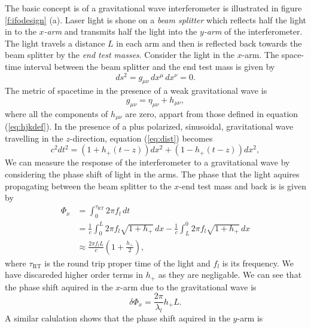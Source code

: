 The basic concept is of a gravitational wave interferometer is illustrated in
figure \ref{f:ifodesign} (a). Laser light is shone on a \emph{beam splitter}
which reflects half the light in to the \emph{$x$-arm} and transmits half the
light into the \emph{$y$-arm} of the interferometer. The light travels a
distance $L$ in each arm and then is reflected back towards the beam splitter
by the \emph{end test masses}. Consider the light in the $x$-arm. The
space-time interval between the beam splitter and the end test mass is given
by
\begin{equation}
ds^2 = g_{\mu\nu}\, dx^\mu\, dx^\nu = 0.
\label{eq:dist}
\end{equation}
The metric of spacetime in the presence of a weak gravitational wave is
\begin{equation}
g_{\mu\nu} = \eta_{\mu\nu} + h_{\mu\nu},
\end{equation}
where all the components of $h_{\mu\nu}$ are zero, appart from those defined
in equation (\ref{eq:hjkdef}). In the presence of a plus polarized,
sinusoidal, gravitational wave travelling in the $z$-direction, equation
(\ref{eq:dist}) becomes
\begin{equation}
c^2 dt^2 = \left(1 + h_{+}(t-z)\right) dx^2 + \left(1 - h_{+}(t-z)\right) dx^2,
\end{equation}
We can measure the response of the interferometer to a gravitational wave by
considering the phase shift of light in the arms. The phase that the light
aquires propagating between the beam splitter to the $x$-end test mass and
back is is given by\cite{Saulson:1994}
\begin{equation}
\begin{split}
\Phi_x &= \int_0^{\tau_\mathrm{RT}} 2\pi f_l\, dt \\
&= \frac{1}{c} \int_0^L 2\pi f_l \sqrt{1 + h_{+}}\,dx -
\frac{1}{c} \int_L^0 2\pi f_l \sqrt{1 + h_{+}}\,dx \\
&\approx \frac{2\pi f_l L}{c} \left(1 + \frac{h_{+}}{2}\right),
\end{split}
\end{equation}
where $\tau_\mathrm{RT}$ is the round trip proper time of the light and $f_l$ is
its frequency. We have discareded  higher order terms in $h_+$ as they are
negligable.  We can see that the phase shift aquired in the $x$-arm due to the
gravitational wave is
\begin{equation}
\delta \Phi_x = \frac{2\pi}{\lambda_l} h_{+} L.
\end{equation}
A similar calulation shows that the phase shift aquired in the $y$-arm is
